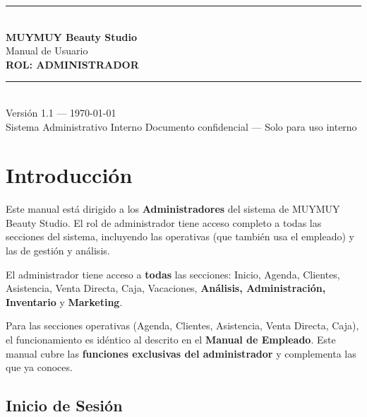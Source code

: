 \documentclass[12pt,a4paper]{article}
\begin{document}
\begin{titlepage}
  \centering
  \vspace*{4cm}
  {\color{primario}\rule{\linewidth}{1pt}}\\[1cm]
  {\color{oscuro}\Huge\bfseries MUYMUY Beauty Studio}\\[0.5cm]
  {\color{primario}\Large Manual de Usuario}\\[0.3cm]
  {\color{oscuro}\LARGE\bfseries ROL: ADMINISTRADOR}\\[1cm]
  {\color{primario}\rule{\linewidth}{1pt}}\\[2cm]
  {\color{gris}\large Versión 1.1 --- \today}\\[0.5cm]
  {\color{gris}\normalsize Sistema Administrativo Interno}
  \vfill
  {\color{oscuro}\small Documento confidencial --- Solo para uso interno}
\end{titlepage}
\nopagecolor

\tableofcontents
\newpage

\section{Introducción}

Este manual está dirigido a los \textbf{Administradores} del sistema de MUYMUY Beauty Studio. El rol de administrador tiene acceso completo a todas las secciones del sistema, incluyendo las operativas (que también usa el empleado) y las de gestión y análisis.

\begin{adminbox}
El administrador tiene acceso a \textbf{todas} las secciones: Inicio, Agenda, Clientes, Asistencia, Venta Directa, Caja, Vacaciones, \textbf{Análisis, Administración, Inventario} y \textbf{Marketing}.
\end{adminbox}

\begin{notabox}
Para las secciones operativas (Agenda, Clientes, Asistencia, Venta Directa, Caja), el funcionamiento es idéntico al descrito en el \textbf{Manual de Empleado}. Este manual cubre las \textbf{funciones exclusivas del administrador} y complementa las que ya conoces.
\end{notabox}

\subsection{Inicio de Sesión}
\end{document}
